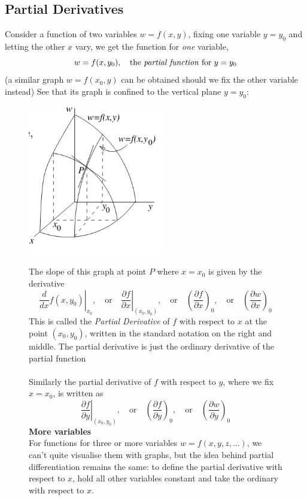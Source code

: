 \documentclass{report}
\begin{document}
\subsection{Partial Derivatives}%
Consider a function of two variables $w=f(x,y)$, fixing one variable 
$y=y_0$ and letting the other $x$ vary, we get the function for \textit{one} variable,
\begin{equation*}
w=f(x,y_0),\quad\text{the \textit{partial function} for }y=y_0
\end{equation*}
(a similar graph $w=f(x_0,y)$ can be obtained should we fix the other variable instead)
See that its graph is confined to the vertical plane $y=y_0$:
\begin{figure}[h]
\begin{center}
\includegraphics[width=6cm]{96}\\
\end{center}
The slope of this graph at point $P$ where $x=x_0$ is given by the derivative 
\begin{equation*}
\left.\frac{d}{dx}f(x,y_0)\right|_{x_0},\quad\text{or}
\quad\left.\frac{\partial f}{\partial x}\right|_{(x_0,y_0)},\quad\text{or}\quad
\left(\frac{\partial f}{\partial x}\right)_0,\quad\text{or}\quad
\left(\frac{\partial w}{\partial x}\right)_0
\end{equation*}
This is called the \textit{Partial Derivative} of $f$ with respect to $x$ at the point $(x_0,y_0)$, written 
in the standard notation on the right and middle. The partial derivative is just 
the ordinary derivative of the partial function\\
\vspace{1mm}\\
Similarly the partial derivative of $f$ with respect to $y$, where we fix $x=x_0$, is written as
\begin{equation*}
\left.\frac{\partial f}{\partial y}\right|_{(x_0,y_0)},\quad\text{or}\quad
\left(\frac{\partial f}{\partial y}\right)_0,\quad\text{or}\quad
\left(\frac{\partial w}{\partial y}\right)_0
\end{equation*}
\textbf{More variables}\\
For functions for three or more variables $w=f(x,y,z,\ldots)$, we can't quite visualise them with graphs, but 
the idea behind partial differentiation remains the same:
to define the partial derivative with respect to $x$, hold all other variables constant and take the 
ordinary with respect to $x$.
\end{figure}
\newpage
\end{document}
